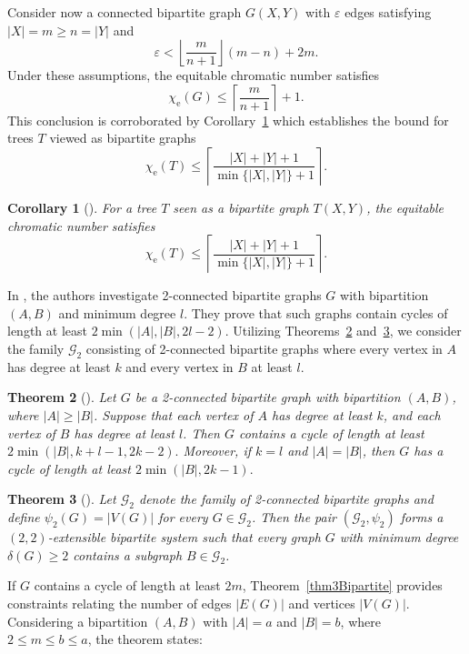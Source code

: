 \documentclass{article}
\newtheorem{theorem}{Theorem}[section]
\newtheorem{corollary}[theorem]{Corollary}
\theoremstyle{definition}
\begin{document}
Consider now a connected bipartite graph $G(X,Y)$ with $\varepsilon$ edges satisfying $|X|=m \geq n = |Y|$ and
\[
\varepsilon < \left\lfloor \frac{m}{n+1} \right\rfloor (m - n) + 2m.
\]
Under these assumptions, the equitable chromatic number satisfies
\[
\chi_{\mathrm{e}}(G) \leqslant \left\lceil \frac{m}{n+1} \right\rceil + 1.
\]
This conclusion is corroborated by Corollary~\ref{cor1bip} which establishes the bound for trees $T$ viewed as bipartite graphs
\[
\chi_{\mathrm{e}}(T) \leqslant \left\lceil \frac{|X| + |Y| + 1}{\min \{|X|, |Y|\} + 1} \right\rceil.
\]

\begin{corollary}[\cite{Lih96WuPl}]\label{cor1bip}
For a tree $T$ seen as a bipartite graph $T(X,Y)$, the equitable chromatic number satisfies
\[
\chi_{\mathrm{e}}(T) \leqslant \left\lceil \frac{|X| + |Y| + 1}{\min\{|X|,|Y|\} + 1} \right\rceil.
\]
\end{corollary}

In \cite{B-Jackson}, the authors investigate 2-connected bipartite graphs $G$ with bipartition $(A,B)$ and minimum degree $l$. They prove that such graphs contain cycles of length at least $2 \min(|A|, |B|, 2l - 2)$. Utilizing Theorems~\ref{thm2Bipartite} and~\ref{thm5bipartite}, we consider the family $\mathcal{G}_2$ consisting of 2-connected bipartite graphs where every vertex in $A$ has degree at least $k$ and every vertex in $B$ at least $l$.

\begin{theorem}[\cite{B-Jackson}]\label{thm2Bipartite}
Let $G$ be a 2-connected bipartite graph with bipartition $(A,B)$, where $|A| \geq |B|$. Suppose that each vertex of $A$ has degree at least $k$, and each vertex of $B$ has degree at least $l$. Then $G$ contains a cycle of length at least $2 \min \left( |B|, k + l - 1, 2k - 2 \right).$
Moreover, if $k = l$ and $|A| = |B|$, then $G$ has a cycle of length at least $2 \min \left( |B|, 2k - 1 \right).$
\end{theorem}

\begin{theorem}[\cite{Hong25YYWu}]\label{thm5bipartite}
Let $\mathcal{G}_2$ denote the family of 2-connected bipartite graphs and define $\psi_2(G) = |V(G)|$ for every $G \in \mathcal{G}_2$. Then the pair $(\mathcal{G}_2, \psi_2)$ forms a $(2,2)$-extensible bipartite system such that every graph $G$ with minimum degree $\delta(G) \geq 2$ contains a subgraph $B \in \mathcal{G}_2$.
\end{theorem}

If $G$ contains a cycle of length at least $2m$, Theorem~\ref{thm3Bipartite} provides constraints relating the number of edges $|E(G)|$ and vertices $|V(G)|$. Considering a bipartition $(A,B)$ with $|A|=a$ and $|B|=b$, where $2 \leq m \leq b \leq a$, the theorem states:
\end{document}
